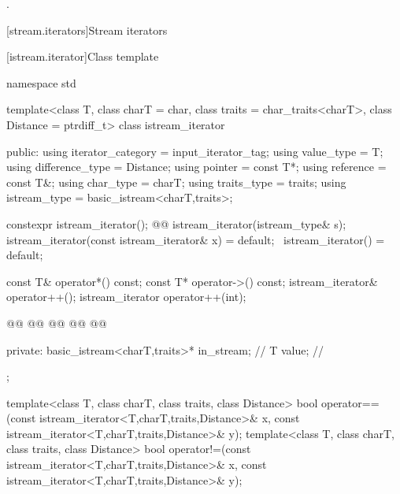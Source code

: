 \begin{itemdescr}
\pnum
\returns {}.
\end{itemdescr}













[stream.iterators]{Stream iterators}

[istream.iterator]{Class template }


\begin{codeblock}
namespace std {
  template<class T, class charT = char, class traits = char_traits<charT>,
           class Distance = ptrdiff_t>
  class istream_iterator {
  public:
    using iterator_category = input_iterator_tag;
    using value_type        = T;
    using difference_type   = Distance;
    using pointer           = const T*;
    using reference         = const T&;
    using char_type         = charT;
    using traits_type       = traits;
    using istream_type      = basic_istream<charT,traits>;

    constexpr istream_iterator();
    @@
    istream_iterator(istream_type& s);
    istream_iterator(const istream_iterator& x) = default;
    ~istream_iterator() = default;

    const T& operator*() const;
    const T* operator->() const;
    istream_iterator& operator++();
    istream_iterator  operator++(int);

    @@
    @@
    @@
    @@
    @@

  private:
    basic_istream<charT,traits>* in_stream; // \expos
    T value;                                // \expos
  };

  template<class T, class charT, class traits, class Distance>
    bool operator==(const istream_iterator<T,charT,traits,Distance>& x,
            const istream_iterator<T,charT,traits,Distance>& y);
  template<class T, class charT, class traits, class Distance>
    bool operator!=(const istream_iterator<T,charT,traits,Distance>& x,
            const istream_iterator<T,charT,traits,Distance>& y);
}
\end{codeblock}

